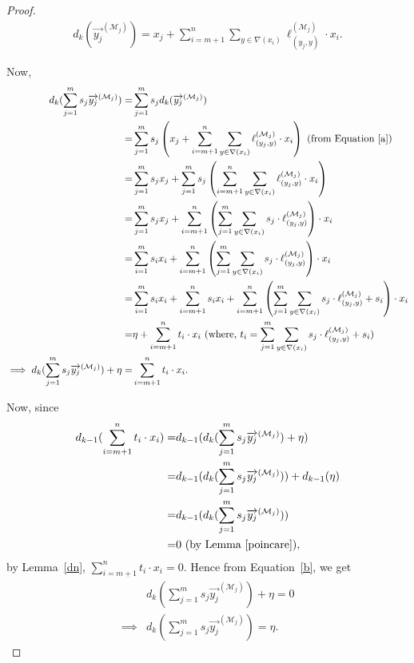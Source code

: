 \documentclass[12pt]{article}
\theoremstyle{definition}
\theoremstyle{remark}
\newcommand{\M}{\mathcal{M}}
\begin{document}
\begin{proof}
     	\begin{align}  \label{a} 
     		d_k (\overrightarrow{y_j}^{(\M_j)})	= x_j +   \sum_{i=m+1}^n \sum_{y\in \nabla(x_i)}\ell^{(\M_j)}_{(y_j,y)} \cdot x_i	.
     	\end{align}
 
  Now,		
     	\begin{align}	\label{b}
     	\nonumber   d_k ( \sum_{j=1}^m s_j \overrightarrow{y_j}^{(\M_j)})=&\sum_{j=1}^m s_jd_k (\overrightarrow{y_j}^{(\M_j)}) \\
     		\nonumber	=&	\sum_{j=1}^m s_j \left(x_j +   \sum_{i=m+1}^n \sum_{y\in \nabla(x_i)}\ell^{(\M_j)}_{(y_j,y)} \cdot x_i	 \right) \text{ (from Equation~\eqref{a})}\\
     		\nonumber	=&	\sum_{j=1}^m s_j x_j +  \sum_{j=1}^m s_j \left( \sum_{i=m+1}^n \sum_{y\in \nabla(x_i)}\ell^{(\M_j)}_{(y_j,y)} \cdot x_i \right)\\
     		\nonumber	=&	\sum_{j=1}^m s_j x_j +   \sum_{i=m+1}^n \left( \sum_{j=1}^m  \sum_{y\in \nabla(x_i)}s_j \cdot \ell^{(\M_j)}_{(y_j,y)}  \right)\cdot x_i\\
     		\nonumber	=&	\sum_{i=1}^m s_i x_i +   \sum_{i=m+1}^n \left( \sum_{j=1}^m  \sum_{y\in \nabla(x_i)}s_j \cdot \ell^{(\M_j)}_{(y_j,y)}  \right)\cdot x_i\\
     		\nonumber	=&	\sum_{i=1}^m s_i x_i + \sum_{i=m+1}^n s_ix_i+  \sum_{i=m+1}^n \left( \sum_{j=1}^m  \sum_{y\in \nabla(x_i)}s_j \cdot \ell^{(\M_j)}_{(y_j,y)} +s_i \right)\cdot x_i\\
     		\nonumber	=&	\eta +  \sum_{i=m+1}^n t_i \cdot x_i \text{ (where, $t_i=\sum_{j=1}^m  \sum_{y\in \nabla(x_i)}s_j \cdot \ell^{(\M_j)}_{(y_j,y)} +s_i$)}\\
     		\implies  d_k ( \sum_{j=1}^m s_j \overrightarrow{y_j}^{(\M_j)})+\eta=& \sum_{i=m+1}^n t_i \cdot x_i.
     		\end{align}
     		
     		Now, since 
     		\begin{align*}
     		d_{k-1}(\sum_{i=m+1}^n t_i \cdot x_i)=&d_{k-1}( d_k ( \sum_{j=1}^m s_j \overrightarrow{y_j}^{(\M_j)})+\eta)\\
     		=& 	d_{k-1}( d_k ( \sum_{j=1}^m s_j \overrightarrow{y_j}^{(\M_j)}))+d_{k-1}(\eta)\\
     		=&	d_{k-1}( d_k ( \sum_{j=1}^m s_j \overrightarrow{y_j}^{(\M_j)}))\\
     		=& 0 \text{ (by Lemma~\ref{poincare})}, 
     		\end{align*}
     by Lemma~\ref{dn}, $\sum_{i=m+1}^n t_i \cdot x_i=0$. Hence from Equation~\eqref{b}, we get
    \begin{align*}
    	  &d_k ( \sum_{j=1}^m s_j \overrightarrow{y_j}^{(\M_j)})+\eta=0\\
    	  \implies &d_k ( \sum_{j=1}^m s_j \overrightarrow{y_j}^{(\M_j)})=\eta.
    \end{align*}	
     \end{proof}
     
\end{document}
